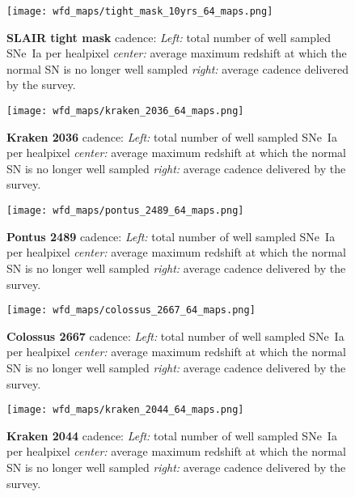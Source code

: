 \begin{figure}[h!]
  \begin{center}
    \texttt{[image: wfd\_maps/tight\_mask\_10yrs\_64\_maps.png]}
    \caption{{\bf SLAIR tight mask} cadence: {\em Left:} total number of well
      sampled SNe~Ia per healpixel {\em center:} average maximum
      redshift at which the normal SN is no longer well sampled {\em
        right:} average cadence delivered by the survey.}
    \label{fig:tight_mask}
  \end{center}
\end{figure}

\begin{figure}[h!]
  \begin{center}
    \texttt{[image: wfd\_maps/kraken\_2036\_64\_maps.png]}
    \caption{{\bf Kraken 2036} cadence: {\em Left:} total number of well
      sampled SNe~Ia per healpixel {\em center:} average maximum
      redshift at which the normal SN is no longer well sampled {\em
        right:} average cadence delivered by the survey.}
    \label{fig:kraken_2036}
  \end{center}
\end{figure}

\begin{figure}[h!]
  \begin{center}
    \texttt{[image: wfd\_maps/pontus\_2489\_64\_maps.png]}
    \caption{{\bf Pontus 2489} cadence: {\em Left:} total number of well
      sampled SNe~Ia per healpixel {\em center:} average maximum
      redshift at which the normal SN is no longer well sampled {\em
        right:} average cadence delivered by the survey.}
    \label{fig:pontus_2489}
  \end{center}
\end{figure}

\begin{figure}[h!]
  \begin{center}
    \texttt{[image: wfd\_maps/colossus\_2667\_64\_maps.png]}
    \caption{{\bf Colossus 2667} cadence: {\em Left:} total number of well
      sampled SNe~Ia per healpixel {\em center:} average maximum
      redshift at which the normal SN is no longer well sampled {\em
        right:} average cadence delivered by the survey.}
  \end{center}
  \label{fig:colossus_2667}
\end{figure}

\begin{figure}[h!]
  \begin{center}
    \texttt{[image: wfd\_maps/kraken\_2044\_64\_maps.png]}
    \caption{{\bf Kraken 2044} cadence: {\em Left:} total number of well
      sampled SNe~Ia per healpixel {\em center:} average maximum
      redshift at which the normal SN is no longer well sampled {\em
        right:} average cadence delivered by the survey.}
    \label{fig:kraken_2044}
  \end{center}
\end{figure}

